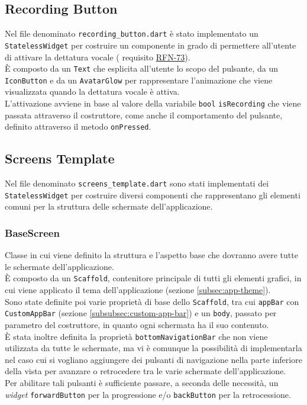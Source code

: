 \subsection{Recording Button}
\label{subsec:recording-button}

Nel file denominato \lstinline{recording_button.dart} è stato implementato un \lstinline{StatelessWidget} per costruire un componente in grado di permettere all'utente di attivare la dettatura vocale ( requisito \hyperref[RFN-73]{RFN-73}).\\
È composto da un \lstinline{Text}\cite{site:text} che esplicita all'utente lo scopo del pulsante, da un \lstinline{IconButton}\cite{site:icon-button} e da un \lstinline{AvatarGlow}\cite{site:avatar-glow} per rappresentare l'animazione che viene visualizzata quando la dettatura vocale è attiva.\\
L'attivazione avviene in base al valore della variabile \lstinline{bool} \lstinline{isRecording} che viene passata attraverso il costruttore, come anche il comportamento del pulsante, definito attraverso il metodo \lstinline{onPressed}\cite{site:on-pressed}.

\subsection{Screens Template}
\label{subsec:screens-template}

Nel file denominato \lstinline{screens_template.dart} sono stati implementati dei \lstinline{StatelessWidget} per costruire diversi componenti che rappresentano gli elementi comuni per la struttura delle schermate dell'applicazione.

\subsubsection*{BaseScreen}
\label{subsubsec:base-screen}

Classe in cui viene definito la struttura e l'aspetto base che dovranno avere tutte le schermate dell'applicazione.\\
È composto da un \lstinline{Scaffold}\cite{site:scaffold}, contenitore principale di tutti gli elementi grafici, in cui viene applicato il tema dell'applicazione (sezione \ref{subsec:app-theme}). \\
Sono state definite poi varie proprietà di base dello \lstinline{Scaffold}, tra cui \lstinline{appBar} con \lstinline{CustomAppBar} (sezione \ref{subsubsec:custom-app-bar}) e un \lstinline{body}, passato per parametro del costruttore, in quanto ogni schermata ha il suo contenuto.\\
È stata inoltre definita la proprietà \lstinline{bottomNavigationBar} che non viene utilizzata da tutte le schermate, ma vi è comunque la possibilità di implementarla nel caso cui si vogliano aggiungere dei pulsanti di navigazione nella parte inferiore della vista per avanzare o retrocedere tra le varie schermate dell'applicazione.\\
Per abilitare tali pulsanti è sufficiente passare, a seconda delle necessità, un \emph{widget} \lstinline{forwardButton} per la progressione e/o \lstinline{backButton} per la retrocessione.

